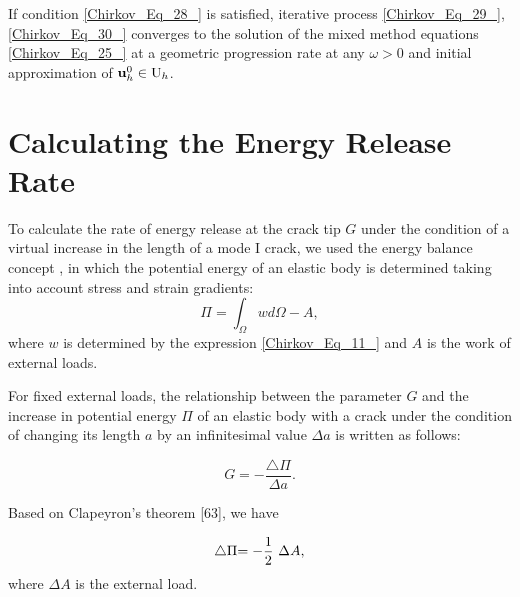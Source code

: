 If condition \eqref{Chirkov_Eq_28_} is satisfied, iterative process \eqref{Chirkov_Eq_29_}, \eqref{Chirkov_Eq_30_} converges to the solution of the mixed method equations \eqref{Chirkov_Eq_25_} at a geometric progression rate at any $\omega>0$ and initial approximation of ${{\mathbf u}}_h^0\in {{\rm U}}_h$.

\section{Calculating the Energy Release Rate}

To calculate the rate of energy release at the crack tip $G$ under the condition of a virtual increase in the length of a mode I crack, we used the energy balance concept \cite{Chirkov61, Chirkov62}, in which the potential energy of an elastic body is determined taking into account stress and strain gradients:
\begin{equation} \label{Chirkov_Eq_31_} 
	\Pi =\int_{\Omega }{wd\Omega }-A, 
\end{equation} 
where $w$ is determined by the expression \eqref{Chirkov_Eq_11_} and $A$ is the work of external loads. 

For fixed external loads, the relationship between the parameter $G$ and the increase in potential energy $\Pi $ of an elastic body with a crack under the condition of changing its length $a$ by an infinitesimal value $\Delta a$ is written as follows: 

\begin{equation} \label{Chirkov_Eq_32_} 
	G=-\frac{\triangle \Pi }{\Delta a}.
\end{equation}

Based on Clapeyron's theorem [63], we have

\begin{equation} \label{Chirkov_Eq_33_} 
	\triangle \Pi {\rm =-}\frac{{\rm 1}}{2}\ \Delta A,
\end{equation}
where $\Delta A$ is the external load. 

